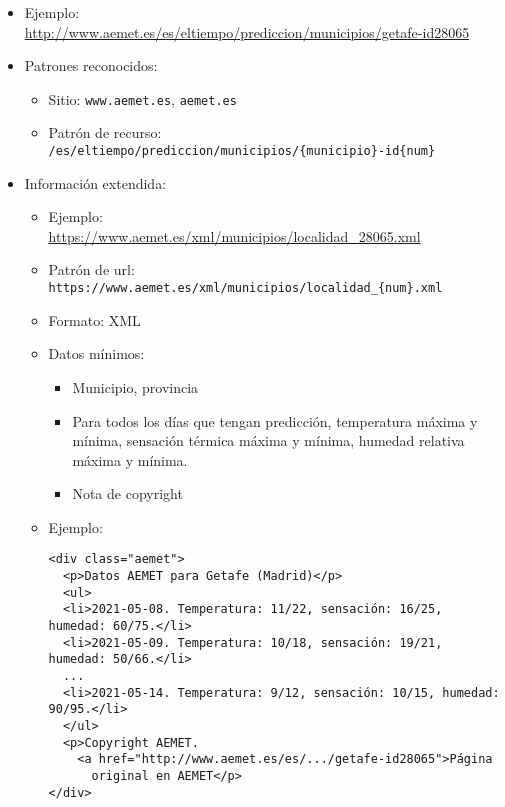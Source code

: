   \begin{itemize}
  \item Ejemplo: \\
    \url{http://www.aemet.es/es/eltiempo/prediccion/municipios/getafe-id28065}
  \item Patrones reconocidos:
    \begin{itemize}
    \item Sitio: \texttt{www.aemet.es}, \texttt{aemet.es}
    \item Patrón de recurso: \\
      \texttt{/es/eltiempo/prediccion/municipios/\{municipio\}-id\{num\}}
    \end{itemize}
  \item Información extendida:
    \begin{itemize}
    \item Ejemplo: \\
      \url{https://www.aemet.es/xml/municipios/localidad_28065.xml}
    \item Patrón de url: \\
      \texttt{https://www.aemet.es/xml/municipios/localidad\_\{num\}.xml}
    \item Formato: XML
    \item Datos mínimos:
      \begin{itemize}
      \item Municipio, provincia
      \item Para todos los días que tengan predicción, temperatura máxima y mínima, sensación térmica máxima y mínima, humedad relativa máxima y mínima.
      \item Nota de copyright
      \end{itemize}
    \item Ejemplo:

{\footnotesize
\begin{verbatim}
<div class="aemet">
  <p>Datos AEMET para Getafe (Madrid)</p>
  <ul>
  <li>2021-05-08. Temperatura: 11/22, sensación: 16/25, humedad: 60/75.</li>
  <li>2021-05-09. Temperatura: 10/18, sensación: 19/21, humedad: 50/66.</li>
  ...
  <li>2021-05-14. Temperatura: 9/12, sensación: 10/15, humedad: 90/95.</li>
  </ul>
  <p>Copyright AEMET.
    <a href="http://www.aemet.es/es/.../getafe-id28065">Página
      original en AEMET</p>
</div>
\end{verbatim}
}
  \end{itemize}
    \end{itemize}


